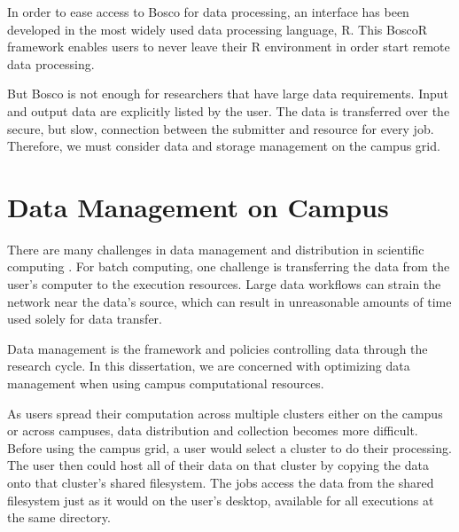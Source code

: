 In order to ease access to Bosco for data processing, an interface has been developed in the most widely used data processing language, R.  This BoscoR framework enables users to never leave their R environment in order start remote data processing.

But Bosco is not enough for researchers that have large data requirements.  Input and output data are explicitly listed by the user.  The data is transferred over the secure, but slow, connection between the submitter and resource for every job.  Therefore, we must consider data and storage management on the campus grid.










\section{Data Management on Campus}

There are many challenges in data management and distribution in scientific computing \cite{deelman2008data}.  For batch computing, one challenge is transferring the data from the user's computer to the execution resources.  Large data workflows can strain the network near the data's source, which can result in unreasonable amounts of time used solely for data transfer.

Data management is the framework and policies controlling data through the research cycle.  In this dissertation, we are concerned with optimizing data management when using campus computational resources.

As users spread their computation across multiple clusters either on the campus or across campuses, data distribution and collection becomes more difficult.  Before using the campus grid, a user would select a cluster to do their processing.  The user then could host all of their data on that cluster by copying the data onto that cluster's shared filesystem.  The jobs access the data from the shared filesystem just as it would on the user's desktop, available for all executions at the same directory.

